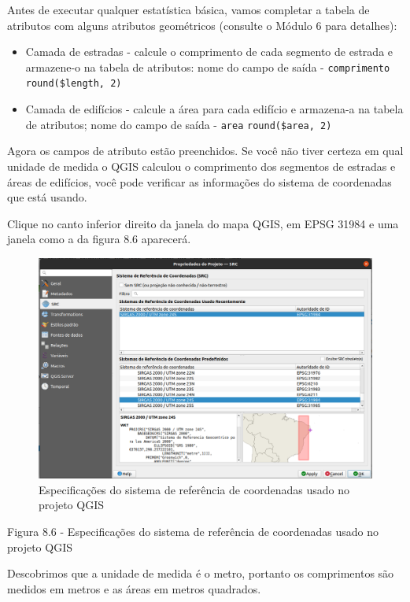 \documentclass[
  portuguese,
]{krantz}
\providecommand{\tightlist}{%
  \setlength{\itemsep}{0pt}\setlength{\parskip}{0pt}}
\begin{document}
Antes de executar qualquer estatística básica, vamos completar a tabela de atributos com alguns atributos geométricos (consulte o Módulo 6 para detalhes):

\begin{itemize}
\tightlist
\item
  Camada de estradas - calcule o comprimento de cada segmento de estrada e armazene-o na tabela de atributos: nome do campo de saída - \texttt{comprimento} \texttt{round(\$length,\ 2)}
\item
  Camada de edifícios - calcule a área para cada edifício e armazena-a na tabela de atributos; nome do campo de saída - \texttt{area} \texttt{round(\$area,\ 2)}
\end{itemize}

Agora os campos de atributo estão preenchidos. Se você não tiver certeza em qual unidade de medida o QGIS calculou o comprimento dos segmentos de estradas e áreas de edifícios, você pode verificar as informações do sistema de coordenadas que está usando.

Clique no canto inferior direito da janela do mapa QGIS, em EPSG 31984 e uma janela como a da figura 8.6 aparecerá.

\begin{figure}
\centering
\includegraphics{media/modulo8/fig86.png}
\caption{Especificações do sistema de referência de coordenadas usado no projeto QGIS}
\end{figure}

Figura 8.6 - Especificações do sistema de referência de coordenadas usado no projeto QGIS

Descobrimos que a unidade de medida é o metro, portanto os comprimentos são medidos em metros e as áreas em metros quadrados.
\end{document}
